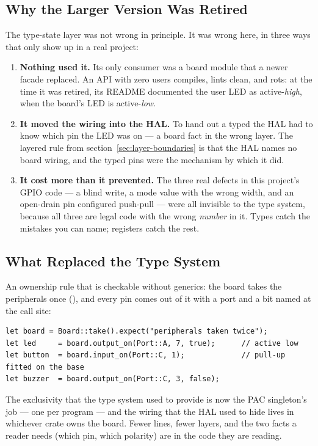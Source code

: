 \subsection{Why the Larger Version Was Retired}

The type-state layer was not wrong in principle. It was wrong here, in three ways that only show up
in a real project:

\begin{enumerate}
    \item \textbf{Nothing used it.} Its only consumer was a board module that a newer facade
          replaced. An API with zero users compiles, lints clean, and rots: at the time it was
          retired, its README documented the user LED as  active-\emph{high}, when
          the board's LED is  active-\emph{low}.
    \item \textbf{It moved the wiring into the HAL.} To hand out a typed  the HAL had
          to know which pin the LED was on — a board fact in the wrong layer. The layered rule from
          section~\ref{sec:layer-boundaries} is that the HAL names no board wiring, and the typed
          pins were the mechanism by which it did.
    \item \textbf{It cost more than it prevented.} The three real defects in this project's GPIO
          code — a blind  write, a mode value with the wrong width, and an
          open-drain pin configured push-pull — were all invisible to the type system, because all
          three are legal code with the wrong \emph{number} in it. Types catch the mistakes you can
          name; registers catch the rest.
\end{enumerate}

\subsection{What Replaced the Type System}

An ownership rule that is checkable without generics: the board takes the peripherals once
(), and every pin comes out of it with a port and a bit named at the call
site:

\begin{verbatim}
let board = Board::take().expect("peripherals taken twice");
let led     = board.output_on(Port::A, 7, true);      // active low
let button  = board.input_on(Port::C, 1);             // pull-up fitted on the base
let buzzer  = board.output_on(Port::C, 3, false);
\end{verbatim}

The exclusivity that the type system used to provide is now the PAC singleton's job — one
 per program — and the wiring that the HAL used to hide lives in whichever crate
owns the board. Fewer lines, fewer layers, and the two facts a reader needs (which pin, which
polarity) are in the code they are reading.
